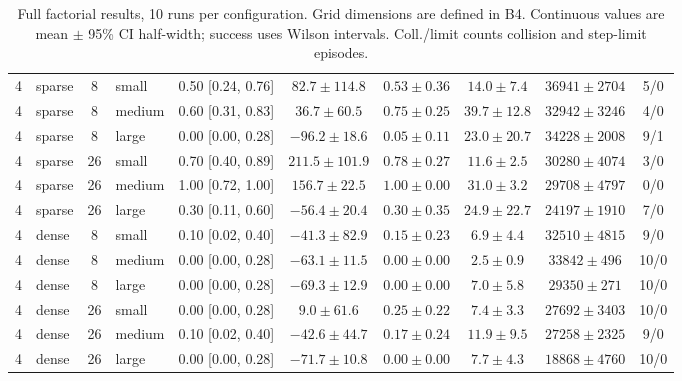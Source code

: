 \documentclass[11pt,a4paper]{article}
\begin{document}
\begin{table}[H]
\begin{tabular}{llclcccccc}
\midrule
4 & sparse & 8 & small & 0.50 [0.24, 0.76] & $82.7 \pm 114.8$ & $0.53 \pm 0.36$ & $14.0 \pm 7.4$ & $36941 \pm 2704$ & 5/0 \\
4 & sparse & 8 & medium & 0.60 [0.31, 0.83] & $36.7 \pm 60.5$ & $0.75 \pm 0.25$ & $39.7 \pm 12.8$ & $32942 \pm 3246$ & 4/0 \\
4 & sparse & 8 & large & 0.00 [0.00, 0.28] & $-96.2 \pm 18.6$ & $0.05 \pm 0.11$ & $23.0 \pm 20.7$ & $34228 \pm 2008$ & 9/1 \\
4 & sparse & 26 & small & 0.70 [0.40, 0.89] & $211.5 \pm 101.9$ & $0.78 \pm 0.27$ & $11.6 \pm 2.5$ & $30280 \pm 4074$ & 3/0 \\
4 & sparse & 26 & medium & 1.00 [0.72, 1.00] & $156.7 \pm 22.5$ & $1.00 \pm 0.00$ & $31.0 \pm 3.2$ & $29708 \pm 4797$ & 0/0 \\
4 & sparse & 26 & large & 0.30 [0.11, 0.60] & $-56.4 \pm 20.4$ & $0.30 \pm 0.35$ & $24.9 \pm 22.7$ & $24197 \pm 1910$ & 7/0 \\
4 & dense & 8 & small & 0.10 [0.02, 0.40] & $-41.3 \pm 82.9$ & $0.15 \pm 0.23$ & $6.9 \pm 4.4$ & $32510 \pm 4815$ & 9/0 \\
4 & dense & 8 & medium & 0.00 [0.00, 0.28] & $-63.1 \pm 11.5$ & $0.00 \pm 0.00$ & $2.5 \pm 0.9$ & $33842 \pm 496$ & 10/0 \\
4 & dense & 8 & large & 0.00 [0.00, 0.28] & $-69.3 \pm 12.9$ & $0.00 \pm 0.00$ & $7.0 \pm 5.8$ & $29350 \pm 271$ & 10/0 \\
4 & dense & 26 & small & 0.00 [0.00, 0.28] & $9.0 \pm 61.6$ & $0.25 \pm 0.22$ & $7.4 \pm 3.3$ & $27692 \pm 3403$ & 10/0 \\
4 & dense & 26 & medium & 0.10 [0.02, 0.40] & $-42.6 \pm 44.7$ & $0.17 \pm 0.24$ & $11.9 \pm 9.5$ & $27258 \pm 2325$ & 9/0 \\
4 & dense & 26 & large & 0.00 [0.00, 0.28] & $-71.7 \pm 10.8$ & $0.00 \pm 0.00$ & $7.7 \pm 4.3$ & $18868 \pm 4760$ & 10/0 \\
\bottomrule
\end{tabular}
\caption{Full factorial results, 10 runs per configuration. Grid dimensions are defined in B4. Continuous values are mean $\pm$ 95\% CI half-width; success uses Wilson intervals. Coll./limit counts collision and step-limit episodes.}
\label{tab:b4-full}
\end{table}

\end{document}
